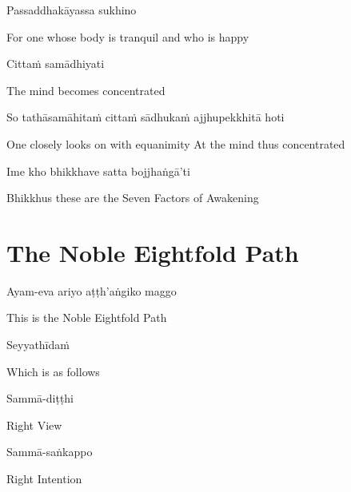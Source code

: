 Passaddhakāyassa sukhino

\begin{cprenglish}
For one whose body is tranquil and who is happy
\end{cprenglish}

Cittaṁ samādhiyati

\begin{cprenglish}
The mind becomes concentrated
\end{cprenglish}

So tathāsamāhitaṁ cittaṁ sādhukaṁ ajjhupekkhitā hoti

\begin{cprenglish}
One closely looks on with equanimity
At the mind thus concentrated
\end{cprenglish}


Ime kho bhikkhave satta bojjhaṅgā’ti

\begin{cprenglish}
Bhikkhus these are the Seven Factors of Awakening
\end{cprenglish}


\clearpage

\section*{The Noble Eightfold Path}

\begin{leader}
\end{leader}

Ayam-eva ariyo aṭṭh'aṅgiko maggo

\begin{cprenglish}
This is the Noble Eightfold Path
\end{cprenglish}

Seyyathīdaṁ

\begin{cprenglish}
Which is as follows
\end{cprenglish}

Sammā-diṭṭhi

\begin{cprenglish}
Right View
\end{cprenglish}

Sammā-saṅkappo

\begin{cprenglish}
Right Intention
\end{cprenglish}

